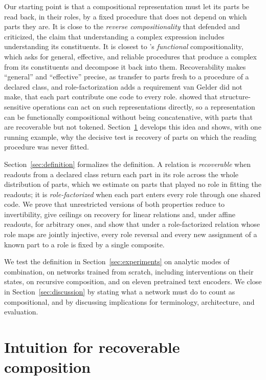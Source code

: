 \documentclass[10pt]{article}
\theoremstyle{plain}
\theoremstyle{remark}
\begin{document}
Our starting point is that a compositional representation must let its parts be read back, in their roles, by a fixed procedure that does not depend on which parts they are. It is close to the \emph{reverse compositionality} that \citet{fodor2002} defended and \citet{robbins2005} criticized, the claim that understanding a complex expression includes understanding its constituents. It is closest to \citet{vangelder1990}'s \emph{functional} compositionality, which asks for general, effective, and reliable procedures that produce a complex from its constituents and decompose it back into them. Recoverability makes ``general'' and ``effective'' precise, as transfer to parts fresh to a procedure of a declared class, and role-factorization adds a requirement van Gelder did not make, that each part contribute one code to every role. \citet{chalmers1990} showed that structure-sensitive operations can act on such representations directly, so a representation can be functionally compositional without being concatenative, with parts that are recoverable but not tokened. Section~\ref{sec:intuition} develops this idea and shows, with one running example, why the decisive test is recovery of parts on which the reading procedure was never fitted.

Section~\ref{sec:definition} formalizes the definition. A relation is \emph{recoverable} when readouts from a declared class return each part in its role across the whole distribution of parts, which we estimate on parts that played no role in fitting the readouts; it is \emph{role-factorized} when each part enters every role through one shared code. We prove that unrestricted versions of both properties reduce to invertibility, give ceilings on recovery for linear relations and, under affine readouts, for arbitrary ones, and show that under a role-factorized relation whose role maps are jointly injective, every role reversal and every new assignment of a known part to a role is fixed by a single composite.

We test the definition in Section~\ref{sec:experiments} on analytic modes of combination, on networks trained from scratch, including interventions on their states, on recursive composition, and on eleven pretrained text encoders. We close in Section~\ref{sec:discussion} by stating what a network must do to count as compositional, and by discussing implications for terminology, architecture, and evaluation.

\section{Intuition for recoverable composition}
\label{sec:intuition}
\end{document}
